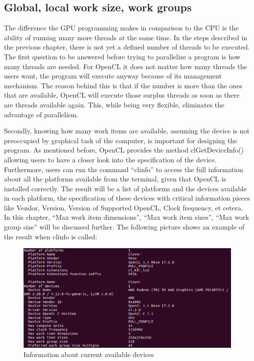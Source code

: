 \subsection{Global, local work size, work groups}
The difference the GPU programming makes in comparison to the CPU is the ability of running many more threads at the same time. In the steps described in the previous chapter, there is not yet a defined number of threads to be executed. The first question to be answered before trying to parallelize a program is how many threads are needed. For OpenCL it does not matter how many threads the users want, the program will execute anyway because of its management mechanism. The reason behind this is that if the number is more than the ones that are available, OpenCL will execute those surplus threads as soon as there are threads available again. This, while being very flexible, eliminates the advantage of parallelism.

Secondly, knowing how many work items are available, assuming the device is not preoccupied by graphical task of the computer, is important for designing the program. As mentioned before, OpenCL provides the method clGetDeviceInfo() allowing users to have a closer look into the specification of the device. Furthermore, users can run the command “clinfo” to access the full information about all the platforms available from the terminal, given that OpenCL is installed correctly. The result will be a list of platforms and the devices available in each platform, the specification of these devices with critical information pieces like Vendor, Version, Version of Supported OpenCL, Clock frequency, et cetera. In this chapter, “Max work item dimensions”, “Max work item sizes”, “Max work group size” will be discussed further. The following picture shows an example of the result when clinfo is called:

\begin{figure}[H]
	\centering
	\includegraphics[width=12cm]{images/clinfo.png}
	\caption{Information about current available devices}
	\label{ExampleOCTImage}
\end{figure}

